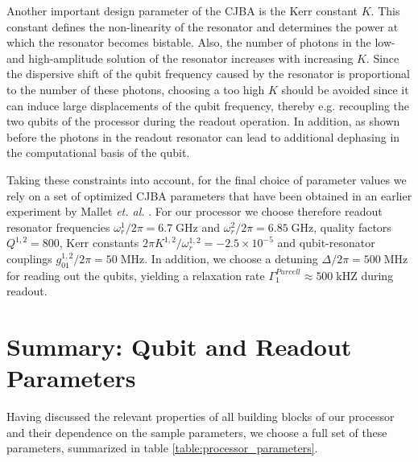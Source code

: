 \smallskip

Another important design parameter of the CJBA is the Kerr constant $K$. This constant defines the non-linearity of the resonator and determines the power at which the resonator becomes bistable. Also, the number of photons in the low- and high-amplitude solution of the resonator increases with increasing $K$. Since the dispersive shift of the qubit frequency caused by the resonator is proportional to the number of these photons, choosing a too high $K$ should be avoided since it can induce large displacements of the qubit frequency, thereby e.g. recoupling the two qubits of the processor during the readout operation. In addition, as shown before the photons in the readout resonator can lead to additional dephasing in the computational basis of the qubit.

\smallskip

Taking these constraints into account, for the final choice of parameter values we rely on a set of optimized CJBA parameters that have been obtained in an earlier experiment by Mallet {\it et. al.} \citep{mallet_single-shot_2009}. For our processor we choose therefore readout resonator frequencies $\omega_r^1/2\pi = 6.7 \;\mathrm{GHz}$ and $\omega_r^2/2\pi = 6.85\;\mathrm{GHz}$, quality factors $Q^{1,2}=800$, Kerr constants $2\pi K^{1,2}/\omega_r^{1,2}=-2.5\times 10^{-5}$ and qubit-resonator couplings $g_{01}^{1,2}/2\pi=50\;\mathrm{MHz}$. In addition, we choose a detuning $\Delta/2\pi = 500\;\mathrm{MHz}$ for reading out the qubits, yielding a relaxation rate $\Gamma^{Purcell}_1\approx 500\;\mathrm{kHZ}$ during readout.

\section{Summary: Qubit and Readout Parameters}

Having discussed the relevant properties of all building blocks of our processor and their dependence on the sample parameters, we choose a full set of these parameters, summarized in table \ref{table:processor_parameters}.

